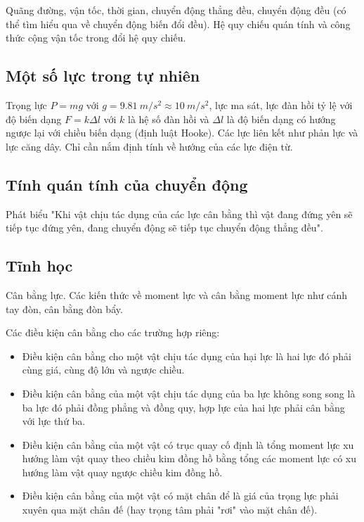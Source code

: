 \documentclass{article}
\begin{document}
\begin{multicols}{2}
Quãng đường, vận tốc, thời gian, chuyển động thẳng đều, chuyển động đều (có thể tìm hiểu qua về chuyển động biến đổi đều). Hệ quy chiếu quán tính và công thức cộng vận tốc trong đổi hệ quy chiếu.

\subsection{Một số lực trong tự nhiên}

Trọng lực $P=mg$ với $g=\SI{9.81}{m/s^2}\approx \SI{10}{m/s^2}$, lực ma sát, lực đàn hồi tỷ lệ với độ biến dạng $F=k \Delta l$ với $k$ là hệ số đàn hồi và $\Delta l$ là độ biến dạng có hướng ngược lại với chiều biến dạng (định luật Hooke). Các lực liên kết như phản lực và lực căng dây. Chỉ cần nắm định tính về hướng của các lực điện từ.

\subsection{Tính quán tính của chuyển động}

Phát biểu "Khi vật chịu tác dụng của các lực cân bằng thì vật đang đứng yên sẽ tiếp tục đứng yên, đang chuyển động sẽ tiếp tục chuyển động thẳng đều".

\subsection{Tĩnh học}

Cân bằng lực. Các kiến thức về moment lực và cân bằng moment lực như cánh tay đòn, cân bằng đòn bẩy. 

Các điều kiện cân bằng cho các trường hợp riêng:
\begin{itemize}
    \item Điều kiện cân bằng cho một vật chịu tác dụng của hại lực là hai lực đó phải cùng giá, cùng độ lớn và ngược chiều.
    \item Điều kiện cân bằng của một vật chịu tác dụng của ba lực không song song là ba lực đó phải đồng phẳng và đồng quy, hợp lực của hai lực phải cân bằng với lực thứ ba.
    \item Điều kiện cân bằng của một vật có trục quay cố định là tổng moment lực xu hướng làm vật quay theo chiều kim đồng hồ bằng tổng các moment lực có xu hướng làm vật quay ngược chiều kim đồng hồ.
    \item Điều kiện cân bằng của một vật có mặt chân để là giá của trọng lực phải xuyên qua mặt chân đế (hay trọng tâm phải "rơi" vào mặt chân đế).
\end{itemize}


\end{multicols}
\end{document}
